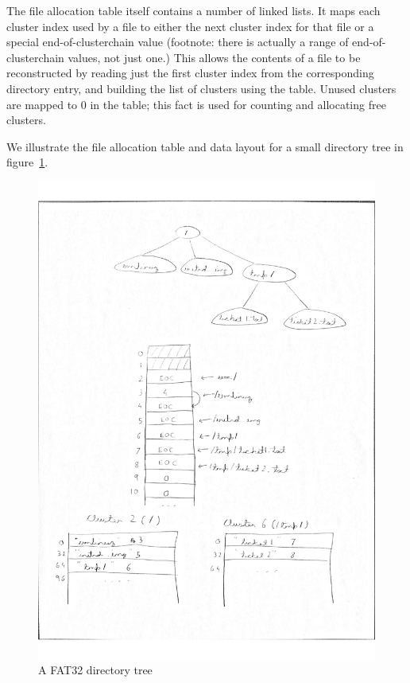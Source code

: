 \documentclass[runningheads,a4paper]{llncs}
\begin{document}
The file allocation table itself contains a number of linked lists. It
maps each cluster index used by a file to either the next cluster
index for that file or a special end-of-clusterchain value (footnote:
there is actually a range of end-of-clusterchain values, not just
one.) This allows the contents of a file to be reconstructed by
reading just the first cluster index from the corresponding directory
entry, and building the list of clusters using the table. Unused
clusters are mapped to 0 in the table; this fact is used for counting
and allocating free clusters.

We illustrate the file allocation table and data layout for a small
directory tree in figure~\ref{fat32-example}.

\begin{figure}
  \caption{A FAT32 directory tree}
  \label{fat32-example}
  \includegraphics[page=1,width=1.10\textwidth]{fat32-diagram.pdf}
\end{figure}
\end{document}
